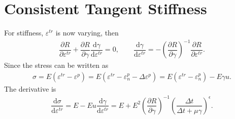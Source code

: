 \documentclass[a4paper,10pt,fleqn]{article}
\newcommand*{\md}[1]{\mathrm{d}#1}
\newcommand*{\pfrac}[2]{\dfrac{\partial#1}{\partial#2}}
\newcommand*{\ddfrac}[2]{\dfrac{\md#1}{\md#2}}
\begin{document}
\section{Consistent Tangent Stiffness}
For stiffness, $\varepsilon^{tr}$ is now varying, then
\begin{gather}
\pfrac{R}{\varepsilon^{tr}}+\pfrac{R}{\gamma}\ddfrac{\gamma}{\varepsilon^{tr}}=0,\qquad\ddfrac{\gamma}{\varepsilon^{tr}}=-\left(\pfrac{R}{\gamma}\right)^{-1}\pfrac{R}{\varepsilon^{tr}}.
\end{gather}
Since the stress can be written as
\begin{gather}
\sigma=E(\varepsilon^{tr}-\varepsilon^p)=E(\varepsilon^{tr}-\varepsilon^p_n-\Delta\varepsilon^p)=E(\varepsilon^{tr}-\varepsilon^p_n)-E\gamma{}u.
\end{gather}
The derivative is
\begin{gather}
\ddfrac{\sigma}{\varepsilon^{tr}}=E-Eu\ddfrac{\gamma}{\varepsilon^{tr}}=E+E^2\left(\pfrac{R}{\gamma}\right)^{-1}\left(\dfrac{\Delta{}t}{\Delta{}t+\mu\gamma}\right)^\epsilon.
\end{gather}
\end{document}
